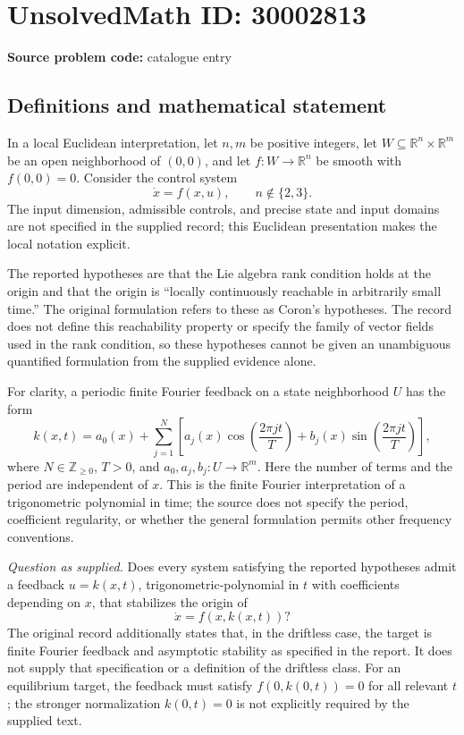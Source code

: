 \documentclass[11pt]{article}
\newcommand{\Z}{\mathbb{Z}}
\newcommand{\R}{\mathbb{R}}
\begin{document}
\section*{UnsolvedMath ID: 30002813}
\textbf{Source problem code:} catalogue entry
\subsection{Definitions and mathematical statement}
In a local Euclidean interpretation, let \(n,m\) be positive integers, let \(W\subseteq\R^n\times\R^m\) be an open neighborhood of \((0,0)\), and let \(f:W\to\R^n\) be smooth with \(f(0,0)=0\). Consider the control system
\[
\dot x=f(x,u),\qquad n\notin\{2,3\}.
\]
The input dimension, admissible controls, and precise state and input domains are not specified in the supplied record; this Euclidean presentation makes the local notation explicit.

The reported hypotheses are that the Lie algebra rank condition holds at the origin and that the origin is ``locally continuously reachable in arbitrarily small time.'' The original formulation refers to these as Coron's hypotheses. The record does not define this reachability property or specify the family of vector fields used in the rank condition, so these hypotheses cannot be given an unambiguous quantified formulation from the supplied evidence alone.

For clarity, a periodic finite Fourier feedback on a state neighborhood \(U\) has the form
\[
 k(x,t)=a_0(x)+\sum_{j=1}^{N}\left[a_j(x)\cos\!\left(\frac{2\pi jt}{T}\right)+b_j(x)\sin\!\left(\frac{2\pi jt}{T}\right)\right],
\]
where \(N\in\Z_{\geq0}\), \(T>0\), and \(a_0,a_j,b_j:U\to\R^m\). Here the number of terms and the period are independent of \(x\). This is the finite Fourier interpretation of a trigonometric polynomial in time; the source does not specify the period, coefficient regularity, or whether the general formulation permits other frequency conventions.

\emph{Question as supplied.} Does every system satisfying the reported hypotheses admit a feedback \(u=k(x,t)\), trigonometric-polynomial in \(t\) with coefficients depending on \(x\), that stabilizes the origin of
\[
\dot x=f(x,k(x,t))?
\]
The original record additionally states that, in the driftless case, the target is finite Fourier feedback and asymptotic stability as specified in the report. It does not supply that specification or a definition of the driftless class. For an equilibrium target, the feedback must satisfy \(f(0,k(0,t))=0\) for all relevant \(t\); the stronger normalization \(k(0,t)=0\) is not explicitly required by the supplied text.
\end{document}
